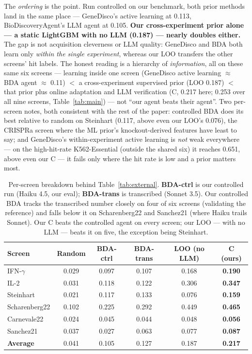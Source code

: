 \documentclass[11pt]{article}
\begin{document}
\noindent
The \emph{ordering} is the point. Run controlled on our benchmark, both prior methods land in the same
place --- GeneDisco's active learning at 0.113, BioDiscoveryAgent's LLM agent at 0.105. \textbf{Our
cross-experiment prior alone --- a static LightGBM with no LLM (0.187) --- nearly doubles either.} The
gap is not acquisition cleverness or LLM quality: GeneDisco and BDA both learn only \emph{within the
single experiment}, whereas our LOO transfers the other screens' hit labels. The honest reading is a
hierarchy of \emph{information}, all on these same six screens --- learning inside one screen (GeneDisco
active learning $\approx$ BDA agent $\approx$ 0.11) $<$ a cross-experiment supervised prior (LOO 0.187)
$<$ that prior plus online adaptation and LLM verification (C, 0.217 here; 0.253 over all nine screens,
Table~\ref{tab:main}) --- not ``our agent beats their agent''. Two per-screen notes,
both consistent with the rest of the paper: controlled BDA does its best relative to random on Steinhart
(0.117, above even our LOO's 0.076), the CRISPRa screen where the ML prior's knockout-derived features
have least to say; and GeneDisco's within-experiment active learning is \emph{not} weak everywhere --- on the
high-hit-rate K562-Essential (outside the shared six) it reaches 0.651, above even our C --- it fails
only where the hit rate is low and a prior matters most.

\begin{table}[H]
\centering
\caption{Per-screen breakdown behind Table~\ref{tab:external}. \textbf{BDA-ctrl} is our controlled run
(Haiku 4.5, our eval); \textbf{BDA-trans} is transcribed (Sonnet 3.5). Our controlled BDA tracks the
transcribed number closely on four of six screens (validating the reference) and falls below it on
Scharenberg22 and Sanchez21 (where Haiku trails Sonnet). Our C beats the controlled agent on every
screen; our LOO --- with no LLM --- beats it on five, the exception being Steinhart.}
\label{tab:external_perscreen}
\small
\setlength{\tabcolsep}{6pt}
\begin{tabular}{lccccc}
\toprule
Screen & Random & BDA-ctrl & BDA-trans & LOO (no LLM) & \textbf{C (ours)} \\
\midrule
IFN-$\gamma$   & 0.029 & 0.097 & 0.107 & 0.168 & \textbf{0.190} \\
IL-2           & 0.031 & 0.118 & 0.122 & 0.306 & \textbf{0.347} \\
Steinhart      & 0.021 & 0.117 & 0.133 & 0.076 & \textbf{0.159} \\
Scharenberg22  & 0.102 & 0.225 & 0.292 & 0.449 & \textbf{0.465} \\
Carnevale22    & 0.024 & 0.045 & 0.044 & 0.048 & \textbf{0.056} \\
Sanchez21      & 0.037 & 0.027 & 0.063 & 0.077 & \textbf{0.087} \\
\midrule
\textbf{Average} & 0.041 & 0.105 & 0.127 & 0.187 & \textbf{0.217} \\
\bottomrule
\end{tabular}
\end{table}
\end{document}
